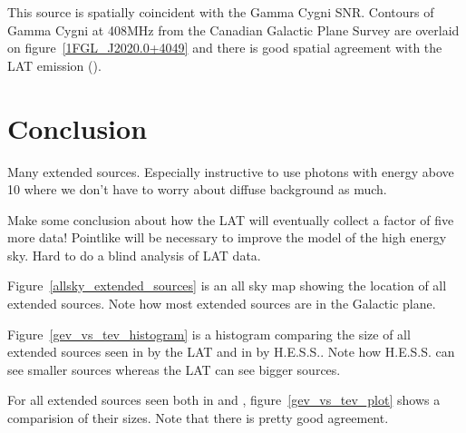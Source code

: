 \documentclass[12pt,preprint]{aastex}
\newcommand{\gev}{\text{GeV}\xspace}
\newcommand{\tev}{\text{TeV}\xspace}
\begin{document}
This source is spatially coincident with the Gamma Cygni SNR.  Contours of
Gamma Cygni at 408MHz from the Canadian Galactic Plane Survey are overlaid
on figure~\ref{1FGL_J2020.0+4049} and there is good spatial agreement
with the LAT emission (\cite{canadian_galactic_plane_survey}).


\section{Conclusion}


Many extended sources. Especially instructive to use photons with energy
above 10 \gev where we don't have to worry about diffuse background
as much.

Make some conclusion about how the LAT will eventually collect a factor
of five more data! Pointlike will be necessary to improve the model of
the high energy sky. Hard to do a blind analysis of LAT data.

Figure~\ref{allsky_extended_sources} is an all sky map showing the
location of all \gev extended sources. Note how most extended sources
are in the Galactic plane.

Figure~\ref{gev_vs_tev_histogram} is a histogram comparing the size of
all extended sources seen in \gev by the LAT and in \tev by H.E.S.S..
Note how H.E.S.S. can see smaller sources whereas the LAT can see
bigger sources.

For all extended sources seen both in \gev and \tev,
figure~\ref{gev_vs_tev_plot} shows a comparision of their sizes.
Note that there is pretty good agreement.





\appendix
\end{document}
